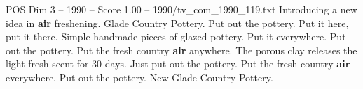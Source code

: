 \begin{textsample}{POS Dim 3 – 1990 – Score 1.00 – 1990/tv\_com\_1990\_119.txt}  \label{ex:f3_pos_077}
Introducing a new idea in \textbf{air} freshening.
Glade Country Pottery.
Put out the pottery.
Put it here, put it there.
Simple handmade pieces of glazed pottery.
Put it everywhere.
Put out the pottery.
Put the fresh country \textbf{air} anywhere.
The porous clay releases the light fresh scent for 30 days.
Just put out the pottery.
Put the fresh country \textbf{air} everywhere.
Put out the pottery.
New Glade Country Pottery.

\end{textsample}
